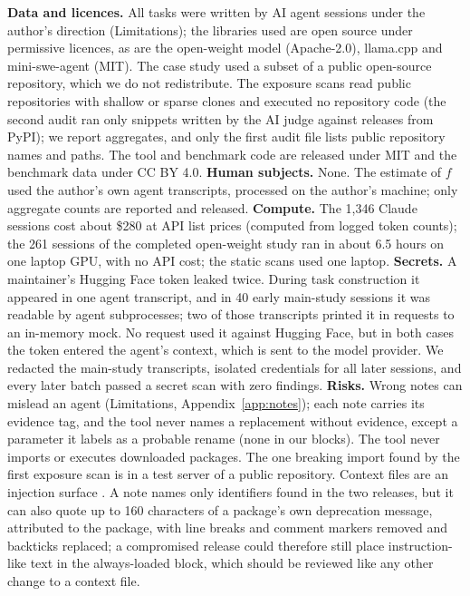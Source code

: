 \documentclass[11pt]{article}
\begin{document}
\textbf{Data and licences.} All tasks were written by AI agent sessions under the author's direction (Limitations); the libraries used are open source under permissive licences, as are the open-weight model (Apache-2.0), llama.cpp and mini-swe-agent (MIT). The case study used a subset of a public open-source repository, which we do not redistribute. The exposure scans read public repositories with shallow or sparse clones and executed no repository code (the second audit ran only snippets written by the AI judge against releases from PyPI); we report aggregates, and only the first audit file lists public repository names and paths. The tool and benchmark code are released under MIT and the benchmark data under CC BY 4.0.
\textbf{Human subjects.} None. The estimate of $f$ used the author's own agent transcripts, processed on the author's machine; only aggregate counts are reported and released.
\textbf{Compute.} The 1,346 Claude sessions cost about \$280 at API list prices (computed from logged token counts); the 261 sessions of the completed open-weight study ran in about 6.5 hours on one laptop GPU, with no API cost; the static scans used one laptop.
\textbf{Secrets.} A maintainer's Hugging Face token leaked twice. During task construction it appeared in one agent transcript, and in 40 early main-study sessions it was readable by agent subprocesses; two of those transcripts printed it in requests to an in-memory mock.
No request used it against Hugging Face, but in both cases the token entered the agent's context, which is sent to the model provider.
We redacted the main-study transcripts, isolated credentials for all later sessions, and every later batch passed a secret scan with zero findings.
\textbf{Risks.} Wrong notes can mislead an agent (Limitations, Appendix~\ref{app:notes}); each note carries its evidence tag, and the tool never names a replacement without evidence, except a parameter it labels as a probable rename (none in our blocks). The tool never imports or executes downloaded packages. The one breaking import found by the first exposure scan is in a test server of a public repository.
Context files are an injection surface \citep{liu2025yourai}. A note names only identifiers found in the two releases, but it can also quote up to 160 characters of a package's own deprecation message, attributed to the package, with line breaks and comment markers removed and backticks replaced; a compromised release could therefore still place instruction-like text in the always-loaded block, which should be reviewed like any other change to a context file.
\end{document}
